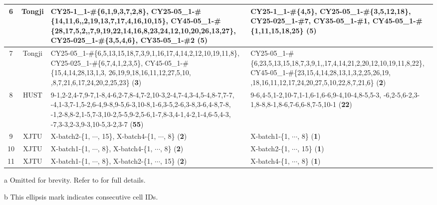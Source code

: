 \documentclass[lettersize,journal]{IEEEtran}
\begin{document}
\begin{table}[htbp]
\begin{threeparttable}
\begin{tabularx}{\textwidth}{ccXX}
        \midrule
        6     & Tongji & CY25-1\_1-\#\{6,1,9,3,7,2,8\}, CY25-05\_1-\#\{14,11,6,\newline 1,2,19,13,7,17,4,16,10,15\},  CY45-05\_1-\#\{28,17,5,2,\newline 21,7,9,19,22,14,16,8,23,24,12,10,20,26,13,27\}, \newline CY25-025\_1-\#\{3,5,4,6\}, CY35-05\_1-\#2 (\textbf{5}) & CY25-1\_1-\#\{4,5\}, CY25-05\_1-\#\{3,5,12,18\}, \newline CY25-025\_1-\#7, CY35-05\_1-\#1, \newline CY45-05\_1-\#\{1,11,15,18,25\} (\textbf{5}) \\
        \midrule
        7     & Tongji & CY25-05\_1-\#\{6,5,13,15,18,7,3,9,1,16,17,4,14,2,12,10,19,11,8\}, \newline CY25-025\_1-\#\{6,7,4,1,2,3,5\}, \newline CY45-05\_1-\#\{15,4,14,28,13,1,3, 26,19,9,18,16,11,12,27,5,10, \newline 22,8,7,21,6,17,24,20,2,25,23\} (\textbf{3}) & CY25-05\_1-\#\{6,23,5,13,15,18,7,3,9,1,\newline 16,17,4,14,21,2,20,12,10,19,11,8,22\}, \newline CY45-05\_1-\#\{23,15,4,14,28,13,1,3,2,25,26,19, \newline 9,18,16,11,12,17,24,20,27,5,10,22,8,7,21,6\} (\textbf{2}) \\
        \midrule
        8     & HUST  & 9-1,2-2,4-7,9-7,1-8,4-6,2-7,8-4,7-2,10-3,2-4,7-4,3-4,5-4,8-7,7-7, \newline 4-4,1-3,7-1,5-2,6-4,9-8,9-5,6-3,10-8,1-6,3-5,2-6,3-8,3-6,4-8,7-8, \newline 5-1,2-8,8-2,1-5,7-3,10-2,5-5,9-2,5-6,1-7,8-3,4-1,4-2,1-4,6-5,4-3, \newline 5-7,3-3,2-3,9-3,10-5,3-2,3-7 (\textbf{55}) & 9-6,4-5,1-2,10-7,1-1,6-1,6-6,9-4,10-4,8-5,5-3, \newline 10-6,2-5,6-2,3-1,8-8,8-1,8-6,7-6,6-8,7-5,10-1 (\textbf{22}) \\
        \midrule
        9     & XJTU  & X-batch2-\{1, $\cdots$\tnote{b}, 15\}, X-batch4-\{1, $\cdots$, 8\} (\textbf{2}) & X-batch1-\{1, $\cdots$, 8\} (\textbf{1}) \\
        \midrule
        10    & XJTU  & X-batch1-\{1, $\cdots$, 8\}, X-batch4-\{1, $\cdots$, 8\} (\textbf{2}) & X-batch2-\{1, $\cdots$, 15\} (\textbf{1}) \\
        \midrule
        11    & XJTU  & X-batch1-\{1, $\cdots$, 8\}, X-batch2-\{1, $\cdots$, 15\} (\textbf{2}) & X-batch4-\{1, $\cdots$, 8\} (\textbf{1}) \\
        \bottomrule
        \end{tabularx}%
        \begin{tablenotes}
          \item[a] Omitted for brevity. Refer to \cite{TAN2024103725} for full details.
          \item[b] This ellipsis mark indicates consecutive cell IDs.
      \end{tablenotes}
      \end{threeparttable}
      \label{tab:tasks}%
      \end{table}%
\end{document}
